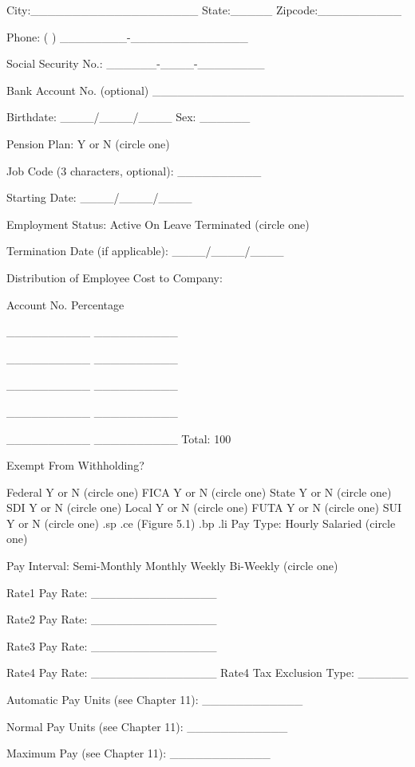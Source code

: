 City:____________________  State:_____	Zipcode:__________

Phone: (      ) ________-______________

Social Security No.: ______-____-________

Bank Account No. (optional) ______________________________

Birthdate: ____/____/____     Sex: ______

Pension Plan:	 Y   or  N   (circle one)

Job Code (3 characters, optional):  __________

Starting Date: ____/____/____

Employment Status: Active  On Leave  Terminated  (circle one)

Termination Date (if applicable): ____/____/____

Distribution of Employee Cost to Company:

	      Account No.	     Percentage

	      __________	     __________

	      __________	     __________

	      __________	     __________

	      __________	     __________

	      __________	     __________
			    Total:	 100 %

Exempt From Withholding?

	      Federal	     Y	  or   N     (circle one)
	      FICA	     Y	  or   N     (circle one)
	      State	     Y	  or   N     (circle one)
	      SDI	     Y	  or   N     (circle one)
	      Local	     Y	  or   N     (circle one)
	      FUTA	     Y	  or   N     (circle one)
	      SUI	     Y	  or   N     (circle one)
.sp
.ce
(Figure 5.1)
.bp
.li
Pay Type:    Hourly   Salaried	   (circle one)

Pay Interval:  Semi-Monthly  Monthly  Weekly  Bi-Weekly  (circle one)

Rate1 Pay Rate:  _______________

Rate2 Pay Rate:  _______________

Rate3 Pay Rate:  _______________

Rate4 Pay Rate:  _______________  Rate4 Tax Exclusion Type:  ______

Automatic Pay Units (see Chapter 11):  ____________

Normal Pay Units (see Chapter 11):  ____________

Maximum Pay (see Chapter 11):  ____________

